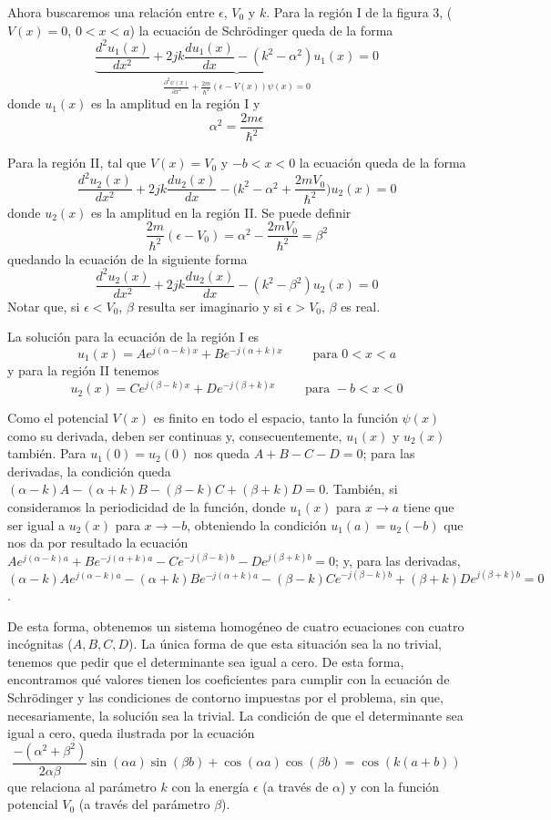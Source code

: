 \documentclass[12pt,a4paper]{article}
\begin{document}
Ahora buscaremos una relación entre $\epsilon$, $V_{0}$ y $k$. Para la región I de la figura 3, ($V(x)=0$, $0<x<a$) la ecuación de Schrödinger queda de la forma
\[ \underbrace{ \frac{d^{2}u_{1}(x)}{dx^{2}}+2jk \frac{du_{1}(x)}{dx} - (k^{2}-\alpha^{2})u_{1}(x)=0 }_{ \frac{\partial^{2} \psi(x)}{\partial x^{2}} + \frac{2m}{\hbar^{2}} (\epsilon - V(x)) \psi (x) = 0} \]
donde $u_{1}(x)$ es la amplitud en la región I y
\[ \alpha^{2}=\frac{2m\epsilon}{\hbar^{2}} \]

Para la región II, tal que $V(x)=V_{0}$ y $-b<x<0$ la ecuación queda de la forma
\[ \frac{d^{2}u_{2}(x)}{dx^{2}}+2jk \frac{du_{2}(x)}{dx} - \bigg( k^{2}-\alpha^{2}+ \frac{2mV_{0}}{\hbar^{2}} \bigg) u_{2}(x)=0 \]
donde $u_{2}(x)$ es la amplitud en la región II. Se puede definir
\[ \frac{2m}{\hbar^{2}}(\epsilon - V_{0})=\alpha^{2} - \frac{2mV_{0}}{\hbar^{2}}=\beta^{2} \]
quedando la ecuación de la siguiente forma
\[ \frac{d^{2}u_{2}(x)}{dx^{2}}+2jk \frac{du_{2}(x)}{dx} - (k^{2}-\beta^{2})u_{2}(x)=0 \]
Notar que, si $\epsilon < V_{0}$, $\beta$ resulta ser imaginario y si $\epsilon > V_{0}$, $\beta$ es real.

La solución para la ecuación de la región I es
\[ u_{1}(x)= Ae^{j(\alpha-k)x} + Be^{-j(\alpha+k)x} \qquad \textrm{ para }0<x<a \]
y para la región II tenemos
\[ u_{2}(x)= Ce^{j(\beta -k)x} + De^{-j(\beta +k)x} \qquad \textrm{ para }-b<x<0 \]

Como el potencial $V(x)$ es finito en todo el espacio, tanto la función $\psi(x)$ como su derivada, deben ser continuas y, consecuentemente, $u_{1}(x)$ y $u_{2}(x)$ también. Para $u_{1}(0)=u_{2}(0)$ nos queda $A+B-C-D=0$; para las derivadas, la condición queda $(\alpha -k)A-(\alpha+k)B-(\beta-k)C+(\beta+k)D=0$. También, si consideramos la periodicidad de la función, donde $u_{1}(x)$ para $x\rightarrow a$ tiene que ser igual a $u_{2}(x)$ para $x\rightarrow -b$, obteniendo la condición $u_{1}(a)=u_{2}(-b)$ que nos da por resultado la ecuación $Ae^{j(\alpha-k)a} + Be^{-j(\alpha+k)a}-Ce^{-j(\beta -k)b} - De^{j(\beta +k)b}=0$; y, para las derivadas, $(\alpha -k)Ae^{j(\alpha-k)a} - (\alpha +k) Be^{-j(\alpha+k)a}- (\beta -k)Ce^{-j(\beta -k)b} + (\beta +k) De^{j(\beta +k)b}=0$.

De esta forma, obtenemos un sistema homogéneo de cuatro ecuaciones con cuatro incógnitas ($A,B,C,D$). La única forma de que esta situación sea la no trivial, tenemos que pedir que el determinante sea igual a cero. De esta forma, encontramos qué valores tienen los coeficientes para cumplir con la ecuación de Schrödinger y las condiciones de contorno impuestas por el problema, sin que, necesariamente, la solución sea la trivial. La condición de que el determinante sea igual a cero, queda ilustrada por la ecuación
\[ \frac{-(\alpha^{2}+\beta^{2})}{2\alpha\beta} \sin(\alpha a) \sin(\beta b) + \cos(\alpha a) \cos(\beta b)= \cos(k(a+b)) \]
que relaciona al parámetro $k$ con la energía $\epsilon$ (a través de $\alpha$) y con la función potencial $V_{0}$ (a través del parámetro  $\beta$).
\end{document}
